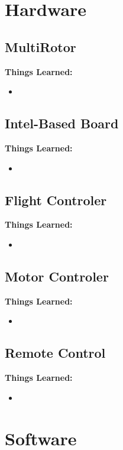 \documentclass[letterpaper,10pt,notitlepage,fleqn]{article}
\begin{document}
\section{Hardware}

\subsection{MultiRotor}
\indent

\textbf{Things Learned:}
\begin{itemize} 
        \item
    \end{itemize}

\subsection{Intel-Based Board}
\indent
\textbf{Things Learned:}
\begin{itemize} 
        \item
    \end{itemize}

\subsection{Flight Controler}
\indent
\textbf{Things Learned:}
\begin{itemize} 
        \item
    \end{itemize}

\subsection{Motor Controler}
\indent
\textbf{Things Learned:}
\begin{itemize} 
        \item
    \end{itemize}

\subsection{Remote Control}
\indent
\textbf{Things Learned:}
\begin{itemize} 
        \item
    \end{itemize}

\section{Software}
\end{document}
